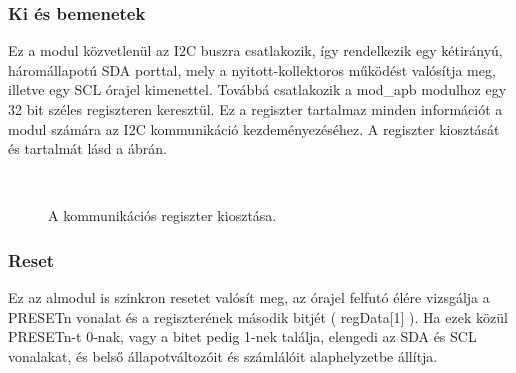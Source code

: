 \subsubsection{Ki és bemenetek}
    Ez a modul közvetlenül az I2C buszra csatlakozik, így rendelkezik egy kétirányú, háromállapotú SDA porttal, mely a nyitott-kollektoros működést valósítja meg, illetve egy SCL órajel kimenettel. Továbbá csatlakozik a mod\_apb modulhoz egy 32 bit széles regiszteren keresztül. Ez a regiszter tartalmaz minden információt a modul számára az I2C kommunikáció kezdeményezéséhez. A regiszter kiosztását és tartalmát lásd a  ábrán.
    \begin{figure}[ht!]
        \centering
        \\[2ex]
        \caption{A kommunikációs regiszter kiosztása.}
        \label{fig:reg}
    \end{figure}

\subsubsection{Reset}
    Ez az almodul is szinkron resetet valósít meg, az órajel felfutó élére vizsgálja a PRESETn vonalat és a regiszterének második bitjét ( regData[1] ). Ha ezek közül PRESETn-t 0-nak, vagy a bitet pedig 1-nek találja, elengedi az SDA és SCL vonalakat, és belső állapotváltozóit és számlálóit alaphelyzetbe állítja.

